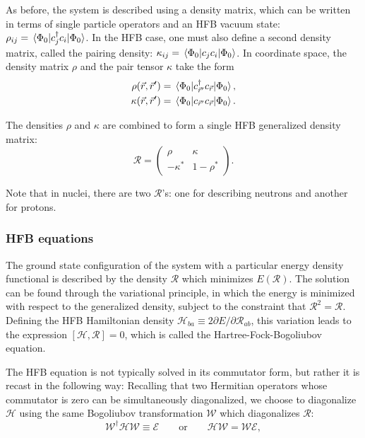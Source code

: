 As before, the system is described using a density matrix, which can be written in terms of single particle operators and an HFB vacuum state: $\rho_{ij} = \expval{c_j^\dagger c_i}{\Phi_0}$. In the HFB case, one must also define a second density matrix, called the pairing density: $\kappa_{ij} = \expval{c_jc_i}{\Phi_0}$. %
In coordinate space, the density matrix $\rho$ and the pair tensor $\kappa$ take the form
\begin{align}
\rho(\vec{r},\vec{r}') &= \expval{c_{\vec{r}'}^\dagger c_{\vec{r}}}{\Phi_0}, \\
\kappa(\vec{r},\vec{r}') &= \expval{c_{\vec{r}'} c_{\vec{r}}}{\Phi_0}.
\end{align}

\noindent The densities $\rho$ and $\kappa$ are combined to form a single HFB generalized density matrix:
\begin{equation}
\mathcal{R} = \left(\begin{array}{cc}
\rho & \kappa \\
-\kappa^* & 1-\rho^*
\end{array}\right).
\end{equation}

\noindent Note that in nuclei, there are two $\mathcal{R}$'s: one for describing neutrons and another for protons.

\subsubsection{HFB equations}

The ground state configuration of the system with a particular energy density functional is described by the density $\mathcal{R}$ which minimizes $E(\mathcal{R})$. The solution can be found through the variational principle, in which the energy is minimized with respect to the generalized density, subject to the constraint that $\mathcal{R}^2=\mathcal{R}$. Defining the HFB Hamiltonian density $\mathcal{H}_{ba} \equiv 2 \partial E/\partial \mathcal{R}_{ab}$, this variation leads to the expression $\left[\mathcal{H},\mathcal{R}\right]=0$, which is called the Hartree-Fock-Bogoliubov equation.

The HFB equation is not typically solved in its commutator form, but rather it is recast in the following way: Recalling that two Hermitian operators whose commutator is zero can be simultaneously diagonalized, we choose to diagonalize $\mathcal{H}$ using the same Bogoliubov transformation $\mathcal{W}$ which diagonalizes $\mathcal{R}$:
\begin{equation}
\mathcal{W}^\dagger \mathcal{H} \mathcal{W} \equiv \mathcal{E} \qquad\mathrm{or}\qquad \mathcal{H}\mathcal{W} = \mathcal{W}\mathcal{E},
\end{equation}

